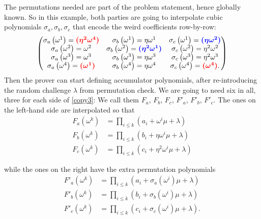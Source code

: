 \documentclass{article}
\newcommand{\redoval}[1]{\textcolor{red}{\boldsymbol{#1}}}
\newcommand{\bluerect}[1]{\textcolor{blue}{\boldsymbol{#1}}}
\begin{document}
The permutations needed are part of the problem statement, hence
globally known. So in this example, both parties are going to
interpolate cubic polynomials \(\sigma_{a},\sigma_{b},\sigma_{c}\) that
encode the weird coefficients row-by-row: \[\begin{pmatrix}
\sigma_{a}\left( \omega^{1} \right) = \redoval{({\eta^{2}\omega^{4}})} & \sigma_{b}\left( \omega^{1} \right) = \eta\omega^{1} & \sigma_{c}\left( \omega^{1} \right) = \bluerect{({\eta\omega^{2}})} \\
\sigma_{a}\left( \omega^{2} \right) = \omega^{2} & \sigma_{b}\left( \omega^{2} \right) = \bluerect{({\eta^{2}\omega^{1}})} & \sigma_{c}\left( \omega^{2} \right) = \eta^{2}\omega^{2} \\
\sigma_{a}\left( \omega^{3} \right) = \omega^{3} & \sigma_{b}\left( \omega^{3} \right) = \eta\omega^{3} & \sigma_{c}\left( \omega^{3} \right) = \eta^{2}\omega^{3} \\
\sigma_{a}\left( \omega^{4} \right) = \redoval{(\omega^{1})} & \sigma_{b}\left( \omega^{4} \right) = \eta\omega^{4} & \sigma_{c}\left( \omega^{4} \right) = \redoval{(\omega^{4})}.
\end{pmatrix}\] Then the prover can start defining accumulator
polynomials, after re-introducing the random challenge \(\lambda\) from
permutation check. We are going to need six in all, three for each side
of \hyperref[copy3]{{[}copy3{]}}: We call them \(F_{a}\), \(F_{b}\),
\(F_{c}\), \(F'_{a}\), \(F'_{b}\), \(F'_{c}\). The ones on the left-hand
side are interpolated so that \[\begin{aligned}
F_{a}\left( \omega^{k} \right) & = \prod_{i \leq k}\left( a_{i} + \omega^{i}\mu + \lambda \right) \\
F_{b}\left( \omega^{k} \right) & = \prod_{i \leq k}\left( b_{i} + \eta\omega^{i}\mu + \lambda \right) \\
F_{c}\left( \omega^{k} \right) & = \prod_{i \leq k}\left( c_{i} + \eta^{2}\omega^{i}\mu + \lambda \right)
\end{aligned}\] \label{copycheck-left}{}

while the ones on the right have the extra permutation polynomials
\[\begin{aligned}
F'_{a}\left( \omega^{k} \right) & = \prod_{i \leq k}\left( a_{i} + \sigma_{a}\left( \omega^{i} \right)\mu + \lambda \right) \\
F'_{b}\left( \omega^{k} \right) & = \prod_{i \leq k}\left( b_{i} + \sigma_{b}\left( \omega^{i} \right)\mu + \lambda \right) \\
F'_{c}\left( \omega^{k} \right) & = \prod_{i \leq k}\left( c_{i} + \sigma_{c}\left( \omega^{i} \right)\mu + \lambda \right).
\end{aligned}\] \label{copycheck-right}{}
\end{document}
